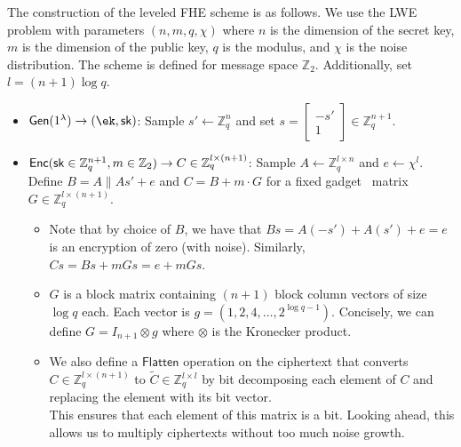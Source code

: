 The construction of the leveled FHE scheme is as follows. We use the LWE problem with parameters $(n, m, q, \chi)$ where $n$ is the dimension of the secret key, $m$ is the dimension of the public key, $q$ is the modulus, and $\chi$ is the noise distribution. The scheme is defined for message space $\mathbb{Z}_2$. Additionally, set $l = (n+1) \log q$.
\begin{itemize}
    \item $\mathsf{Gen}(1^\lambda) \rightarrow (\ek, \sk)$: Sample $s' \gets \mathbb{Z}_q^{n}$ and set $s =  
    \begin{bmatrix}
        -s' \\
        1
    \end{bmatrix} \in \mathbb{Z}_q^{n+1}$. 

    \item $\mathsf{Enc}(\mathsf{sk} \in \mathbb{Z}_q^{n+1}, m \in \mathbb{Z}_2) \rightarrow C \in \mathbb{Z}_q^{l \times (n+1)}$: Sample $A \gets \mathbb{Z}_q^{l \times n}$ and $e \gets \chi^{l}$. Define $B = A \| As' + e$ and $C = B + m \cdot G$ for a fixed gadget~\cite{EC:MicPei12} matrix $G \in \mathbb{Z}_q^{l \times (n+1)}$.
    
    \begin{itemize}
        \item Note that by choice of $B$, we have that $Bs = A(-s') + A(s') + e = e$ is an encryption of zero (with noise). Similarly, $Cs = Bs + mGs = e + mGs$. 
        \item $G$ is a block matrix containing $(n+1)$ block column vectors of size $\log q$ each. Each vector is $g = (1, 2, 4, \ldots, 2^{\log q - 1})$. Concisely, we can define $G = I_{n+1} \otimes g$ where $\otimes$ is the Kronecker product.
        \item We also define a $\mathsf{Flatten}$ operation on the ciphertext that converts $C \in \mathbb{Z}_q^{l \times (n+1)}$ to $\tilde{C} \in \mathbb{Z}_q^{l \times l}$ by bit decomposing each element of $C$ and replacing the element with its bit vector. \\
        This ensures that each element of this matrix is a bit. Looking ahead, this allows us to multiply ciphertexts without too much noise growth.
    \end{itemize}
    
\end{itemize}